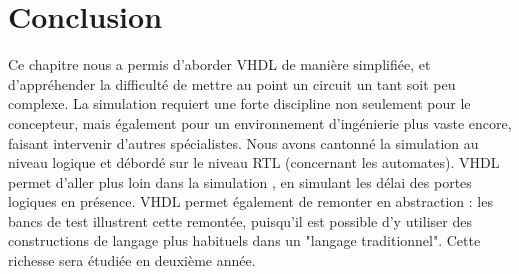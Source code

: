 \section{Conclusion}
Ce chapitre nous a permis d'aborder VHDL de manière simplifiée, et d'appréhender la difficulté de mettre au point un circuit un tant soit peu complexe.
La simulation requiert une forte discipline non seulement pour le concepteur, mais également pour un environnement d'ingénierie plus vaste encore, faisant
intervenir d'autres spécialistes. Nous avons cantonné la simulation au niveau logique et débordé sur le niveau RTL (concernant les automates). VHDL permet
d'aller plus loin dans la simulation , en simulant les délai des portes logiques en présence. VHDL permet également de remonter en abstraction : les bancs de
test illustrent cette remontée, puisqu'il est possible d'y utiliser des constructions de langage plus habituels dans un "langage traditionnel". Cette richesse
sera étudiée en deuxième année.\\

